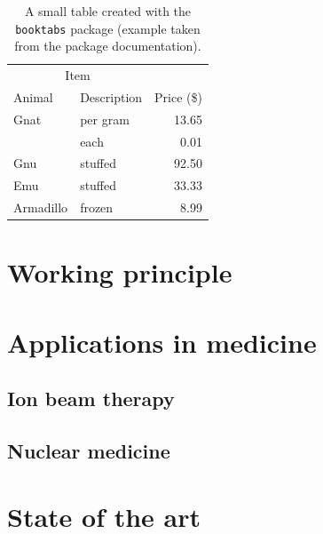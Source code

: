 \begin{table}[H]
\centering
\begin{tabular}{@{}llr@{}} \toprule
\multicolumn{2}{c}{Item} \\ \cmidrule(r){1-2}
Animal & Description & Price (\$)\\ \midrule
Gnat & per gram & 13.65 \\
& each & 0.01 \\
Gnu & stuffed & 92.50 \\
Emu & stuffed & 33.33 \\
Armadillo & frozen & 8.99 \\ \bottomrule
\end{tabular}
\caption[Small table]{A small table created with the \texttt{booktabs} package (example taken from the package documentation).}
\end{table}



\blinditemize

\blindenumerate

\blindmathpaper


\section{Working principle}

\section{Applications in medicine}

\subsection{Ion beam therapy}

\subsection{Nuclear medicine}


\section{State of the art}

\clearpage
